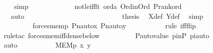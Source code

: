\begin{isabellebody}
\ \ \ \ \ \ \ \ \ \ \ \isamarkupfalse%
\ simp\ \isanewline
\ \ \ \ \ \ \ \ \ \ \isamarkupfalse%
\ not{\isacharunderscore}{\kern0pt}le{\isacharunderscore}{\kern0pt}iff{\isacharunderscore}{\kern0pt}lt\ orda\ Ord{\isacharunderscore}{\kern0pt}in{\isacharunderscore}{\kern0pt}Ord\ P{\isacharunderscore}{\kern0pt}rank{\isacharunderscore}{\kern0pt}ord\ \isanewline
\ \ \ \ \ \ \ \ \ \ \isamarkupfalse%
\ auto\ \isanewline
\ \ \ \ \ \ \ \ \ \ \isamarkupfalse%
\isanewline
\ \ \ \ \ \ \isamarkupfalse%
\isanewline
\ \ \ \ \ \ \isamarkupfalse%
\ \isamarkupfalse%
\ {\isacharquery}{\kern0pt}thesis\ \isamarkupfalse%
\ X{\isacharunderscore}{\kern0pt}def\ Y{\isacharunderscore}{\kern0pt}def\ \isamarkupfalse%
\ simp\ \isanewline
\ \ \ \ \ \ \isamarkupfalse%
\isanewline
\ \ \ \ \ \ \isamarkupfalse%
\ \isamarkupfalse%
\ {\isachardoublequoteopen}{\isachardot}{\kern0pt}{\isachardot}{\kern0pt}{\isachardot}{\kern0pt}\ {\isasymlongleftrightarrow}\ forces{\isacharunderscore}{\kern0pt}mem{\isacharparenleft}{\kern0pt}{\isasympi}{\isacharbackquote}{\kern0pt}p{\isacharcomma}{\kern0pt}\ Pn{\isacharunderscore}{\kern0pt}auto{\isacharparenleft}{\kern0pt}{\isasympi}{\isacharparenright}{\kern0pt}{\isacharbackquote}{\kern0pt}x{\isacharcomma}{\kern0pt}\ Pn{\isacharunderscore}{\kern0pt}auto{\isacharparenleft}{\kern0pt}{\isasympi}{\isacharparenright}{\kern0pt}{\isacharbackquote}{\kern0pt}y{\isacharparenright}{\kern0pt}{\isachardoublequoteclose}\ \isanewline
\ \ \ \ \ \ \ \ \isamarkupfalse%
\ {\isacharparenleft}{\kern0pt}rule\ iff{\isacharunderscore}{\kern0pt}flip{\isacharparenright}{\kern0pt}\isanewline
\ \ \ \ \ \ \ \ \isamarkupfalse%
\ {\isacharparenleft}{\kern0pt}rule{\isacharunderscore}{\kern0pt}tac\ forces{\isacharunderscore}{\kern0pt}mem{\isacharunderscore}{\kern0pt}iff{\isacharunderscore}{\kern0pt}dense{\isacharunderscore}{\kern0pt}below{\isacharparenright}{\kern0pt}\isanewline
\ \ \ \ \ \ \ \ \isamarkupfalse%
\ P{\isacharunderscore}{\kern0pt}auto{\isacharunderscore}{\kern0pt}value\ pinP\ piauto\ \isanewline
\ \ \ \ \ \ \ \ \isamarkupfalse%
\ auto\ \isanewline
\ \ \ \ \ \ \isamarkupfalse%
\ \isamarkupfalse%
\ {\isachardoublequoteopen}MEM{\isacharparenleft}{\kern0pt}p{\isacharcomma}{\kern0pt}\ x{\isacharcomma}{\kern0pt}\ y{\isacharparenright}{\kern0pt}{\isachardoublequoteclose}\ \isamarkupfalse%

\end{isabellebody}
